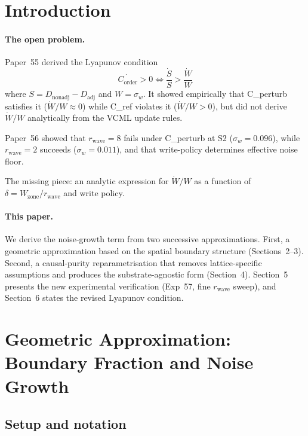 \documentclass[11pt,a4paper]{article}
\newcommand{\Corder}{C_{\mathrm{order}}}
\newcommand{\Dadj}{D_{\mathrm{adj}}}
\newcommand{\Dnadj}{D_{\mathrm{nonadj}}}
\newcommand{\sw}{\sigma_w}
\begin{document}
\section{Introduction}

\paragraph{The open problem.}
Paper~55 derived the Lyapunov condition
\begin{equation}
  \dot{\Corder} > 0 \iff \frac{\dot{S}}{S} > \frac{\dot{W}}{W}
  \label{eq:lyap}
\end{equation}
where $S = \Dnadj - \Dadj$ and $W = \sw$.
It showed empirically that C\_perturb satisfies it ($\dot{W}/W \approx 0$) while
C\_ref violates it ($\dot{W}/W > 0$), but did not derive $\dot{W}/W$ analytically
from the VCML update rules.

Paper~56 showed that $r_\mathrm{wave}=8$ fails under C\_perturb at S2
($\sw=0.096$), while $r_\mathrm{wave}=2$ succeeds ($\sw=0.011$), and that
write-policy determines effective noise floor.

The missing piece: an analytic expression for $\dot{W}/W$ as a function of
$\delta = W_\mathrm{zone}/r_\mathrm{wave}$ and write policy.

\paragraph{This paper.}
We derive the noise-growth term from two successive approximations.
First, a geometric approximation based on the spatial boundary structure
(Sections~2--3).
Second, a causal-purity reparametrisation that removes lattice-specific assumptions
and produces the substrate-agnostic form (Section~4).
Section~5 presents the new experimental verification (Exp~57, fine $r_\mathrm{wave}$
sweep), and Section~6 states the revised Lyapunov condition.

\section{Geometric Approximation: Boundary Fraction and Noise Growth}

\subsection{Setup and notation}
\end{document}
